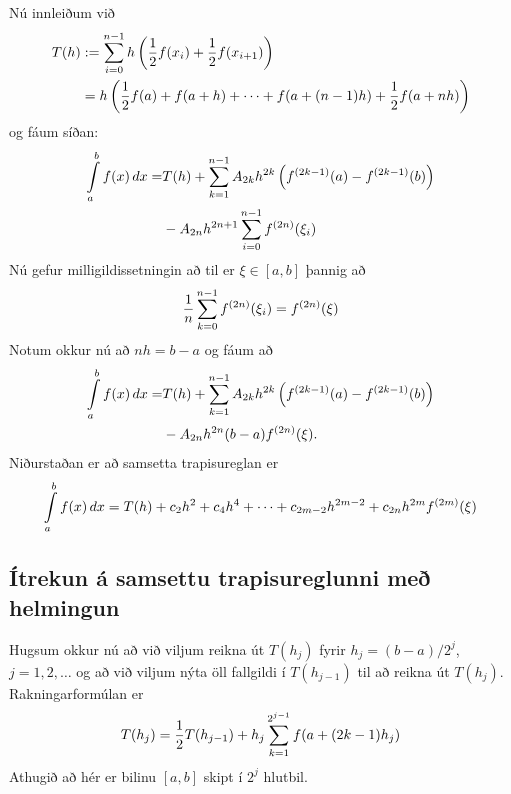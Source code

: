\documentclass[letterpaper,10pt,icelandic]{sphinxmanual}
\begin{document}
Nú innleiðum við
\begin{gather}
\begin{split}\begin{aligned}
T(h)
&:= \sum_{i=0}^{n-1}
h \left( \frac{1}{2} f(x_i) +
\frac{1}{2}f(x_{i+1}) \right)\\
&= h\left( \frac{1}{2}f(a) + f(a+h)
+ \cdots + f(a+(n-1)h) + \frac{1}{2}f(a+nh)\right)\end{aligned}\end{split}\notag
\end{gather}
og fáum síðan:
\begin{gather}
\begin{split}\begin{aligned}
  \int\limits_a^b f(x)\, dx
  = & T(h) + \sum_{k=1}^{n-1}A_{2k}h^{2k}
  \left( f^{(2k-1)}(a) - f^{(2k-1)}(b) \right) \\
  & - A_{2n}h^{2n+1} \sum_{i=0}^{n-1} f^{(2n)}(\xi_i)\end{aligned}\end{split}\notag
\end{gather}
Nú gefur milligildissetningin að til er \(\xi \in [a,b]\) þannig að
\begin{gather}
\begin{split}\frac{1}{n} \sum\limits_{k=0}^{n-1} f^{(2n)}(\xi_i)
  = f^{(2n)}(\xi)\end{split}\notag
\end{gather}
Notum okkur nú að \(nh = b-a\) og fáum að
\begin{gather}
\begin{split}\begin{aligned}
  \int\limits_a^b f(x) \, dx
  = & T(h) + \sum_{k=1}^{n-1}A_{2k}h^{2k}
  \left( f^{(2k-1)}(a) - f^{(2k-1)}(b) \right) \\
  & - A_{2n} h^{2n}(b-a)f^{(2n)}(\xi).\end{aligned}\end{split}\notag
\end{gather}
Niðurstaðan er að samsetta trapisureglan er
\begin{gather}
\begin{split}\int\limits_a^b f(x) \, dx
  = T(h) + c_2h^2 + c_4h^4 + \cdots + c_{2m-2}h^{2m-2}
  + c_{2n}h^{2m}f^{(2m)}(\xi)\end{split}\notag
\end{gather}

\subsection{Ítrekun á samsettu trapisureglunni með helmingun}
\label{kafli05:itrekun-a-samsettu-trapisureglunni-me-helmingun}
Hugsum okkur nú að við viljum reikna út \(T(h_j)\) fyrir
\(h_j =(b-a)/
2^j\), \(j = 1,2,\ldots\) og að við viljum nýta öll fallgildi í
\(T(h_{j-1})\) til að reikna út \(T(h_j)\). Rakningarformúlan er
\begin{gather}
\begin{split}T(h_j) = \frac{1}{2} T(h_{j-1}) + h_j \sum_{k=1}^{2^{j-1}} f(a+(2k-1)h_j)\end{split}\notag
\end{gather}
Athugið að hér er bilinu \([a,b]\) skipt í \(2^j\) hlutbil.
\end{document}
